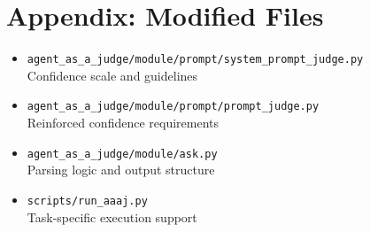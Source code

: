 \documentclass[11pt,a4paper]{article}
\begin{document}
\section*{Appendix: Modified Files}

\begin{itemize}[leftmargin=*]
    \item \texttt{agent\_as\_a\_judge/module/prompt/system\_prompt\_judge.py} \\
    Confidence scale and guidelines
    
    \item \texttt{agent\_as\_a\_judge/module/prompt/prompt\_judge.py} \\
    Reinforced confidence requirements
    
    \item \texttt{agent\_as\_a\_judge/module/ask.py} \\
    Parsing logic and output structure
    
    \item \texttt{scripts/run\_aaaj.py} \\
    Task-specific execution support
\end{itemize}
\end{document}
